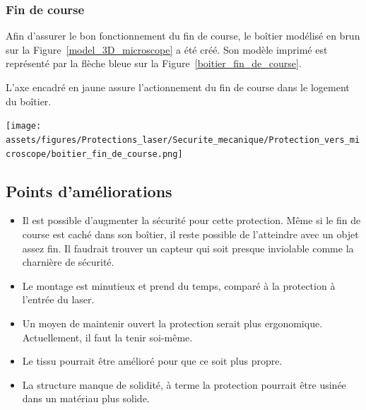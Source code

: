 \subsubsection{Fin de course}
\begin{minipage}[c]{0.48\textwidth}
    Afin d'assurer le bon fonctionnement du fin de course, le boîtier modélisé en \textcolor[RGB]{120, 70, 30}{brun} sur la Figure~\ref{model_3D_microscope} a été créé. Son modèle imprimé est représenté par la flèche \textcolor[RGB]{115, 210, 210}{bleue} sur la Figure~\ref{boitier_fin_de_course}.

    \vspace{1em}
    L'axe encadré en \textcolor[RGB]{233, 173, 56}{jaune} assure l'actionnement du fin de course dans le logement du boîtier.

\end{minipage}\hfill
\begin{minipage}[c]{0.48\textwidth}
    \begin{center}
        \texttt{[image: assets/figures/Protections\_laser/Securite\_mecanique/Protection\_vers\_microscope/boitier\_fin\_de\_course.png]}
    \end{center}
    \label{boitier_fin_de_course}
\end{minipage}

\subsection{Points d'améliorations}
\begin{itemize}
    \item Il est possible d'augmenter la sécurité pour cette protection. Même si le fin de course est caché dans son boîtier, il reste possible de l'atteindre avec un objet assez fin. Il faudrait trouver un capteur qui soit presque inviolable comme la charnière de sécurité.
    \item Le montage est minutieux et prend du temps, comparé à la protection à l'entrée du laser.
    \item Un moyen de maintenir ouvert la protection serait plus ergonomique. Actuellement, il faut la tenir soi-même.
    \item Le tissu pourrait être amélioré pour que ce soit plus propre.
    \item La structure manque de solidité, à terme la protection pourrait être usinée dans un matériau plus solide.
\end{itemize}
